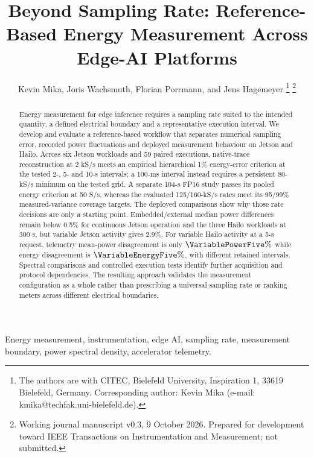 \documentclass[letterpaper,journal]{IEEEtran}
\begin{document}
\title{Beyond Sampling Rate: Reference-Based Energy Measurement Across Edge-AI Platforms}
\author{Kevin Mika, Joris Wachsmuth, Florian Porrmann, and Jens Hagemeyer%
\thanks{The authors are with CITEC, Bielefeld University, Inspiration 1, 33619 Bielefeld, Germany. Corresponding author: Kevin Mika (e-mail: kmika@techfak.uni-bielefeld.de).}%
\thanks{Working journal manuscript v0.3, 9 October 2026. Prepared for development toward IEEE Transactions on Instrumentation and Measurement; not submitted.}}
\maketitle
\begin{abstract}
Energy measurement for edge inference requires a sampling rate suited to the intended quantity, a defined electrical boundary and a representative execution interval. We develop and evaluate a reference-based workflow that separates numerical sampling error, recorded power fluctuations and deployed measurement behaviour on Jetson and Hailo. Across six Jetson workloads and 59 paired executions, native-trace reconstruction at 2 kS/s meets an empirical hierarchical 1\% energy-error criterion at the tested 2-, 5- and 10-s intervals; a 100-ms interval instead requires a persistent 80-kS/s minimum on the tested grid. A separate 104-s FP16 study passes its pooled energy criterion at 50 S/s, whereas the evaluated 125/160-kS/s rates meet its 95/99\% measured-variance coverage targets. The deployed comparisons show why those rate decisions are only a starting point. Embedded/external median power differences remain below 0.5\% for continuous Jetson operation and the three Hailo workloads at 300 s, but variable Jetson activity gives 2.9\%. For variable Hailo activity at a 5-s request, telemetry mean-power disagreement is only $\VariablePowerFive\%$ while energy disagreement is $\VariableEnergyFive\%$, with different retained intervals. Spectral comparisons and controlled execution tests identify further acquisition and protocol dependencies. The resulting approach validates the measurement configuration as a whole rather than prescribing a universal sampling rate or ranking meters across different electrical boundaries.
\end{abstract}
\begin{IEEEkeywords}
Energy measurement, instrumentation, edge AI, sampling rate, measurement boundary, power spectral density, accelerator telemetry.
\end{IEEEkeywords}












\end{document}
